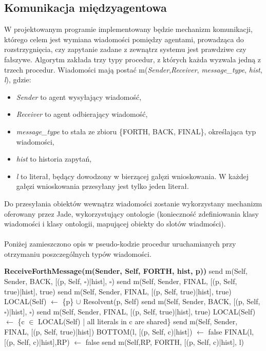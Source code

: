 \documentclass[a4paper,12pt]{mwart}
\begin{document}
\subsection{Komunikacja międzyagentowa}
W projektowanym programie implementowany będzie mechanizm komunikacji, którego celem jest wymiana wiadomości pomiędzy agentami, prowadząca do rozstrzygnięcia, czy zapytanie zadane z zewnątrz systemu jest prawdziwe czy fałszywe.
Algorytm zakłada trzy typy procedur, z których każda wyzwala jedną z trzech procedur. Wiadomości mają postać m(\textit{Sender},\textit{Receiver}, \textit{message\_type}, \textit{hist}, \textit{l}), gdzie:
\begin{itemize}
\item \textit{Sender} to agent wysyłający wiadomość,
\item \textit{Receiver} to agent odbierający wiadomość,
\item \textit{message\_type} to stała ze zbioru \{FORTH, BACK, FINAL\}, określająca typ wiadomości,
\item \textit{hist} to historia zapytań,
\item \textit{l} to literał, będący dowodzony w bierzącej gałęzi wnioskowania. W każdej gałęzi wnioskowania przesyłany jest tylko jeden literał.
\end{itemize}
Do przesyłania obiektów wewnątrz wiadomości zostanie wykorzystany mechanizm oferowany przez Jade, wykorzystujący ontologie (konieczność zdefiniowania klasy wiadomości i klasy ontologii, mapującej obiekty do slotów wiadmości). 
\\\\
Poniżej zamieszczono opis w pseudo-kodzie procedur uruchamianych przy otrzymaniu poszczególnych typów wiadomości.
\begin{algorithm}[H]
\begin{algorithmic}
\STATE \textbf{ReceiveForthMessage(m(Sender, Self, FORTH, hist, p))}
\STATE send m(Self, Sender, BACK, [(p, Self, $\square$)|hist], $\square$)
\STATE send m(Self, Sender, FINAL, [(p, Self, true)|hist], true)
\STATE send m(Self, Sender, FINAL, [(p, Self, true)|hist], true)
\ELSE
\STATE LOCAL(Self) $\leftarrow$ \{p\} $\cup$ Resolvent(p, Self)
\STATE send m(Self, Sender, BACK, [(p, Self, $\square$)|hist], $\square$)
\STATE send m(Self, Sender, FINAL, [(p, Self, true)|hist], true)
\ELSE
\STATE LOCAL(Self) $\leftarrow$ \{c $\in$ LOCAL(Self) | all literals in c are shared\}
\STATE send m(Self, Sender, FINAL, [(p, Self, true)|hist])
\ENDIF
{}
\STATE BOTTOM(l, [(p, Self, c)|hist]) $\leftarrow$ false
\STATE FINAL(l, [(p, Self, c)|hist],RP) $\leftarrow$ false
\STATE send m(Self,RP, FORTH, [(p, Self, c)|hist], l)
\ENDFOR
\ENDFOR
\ENDFOR
\ENDIF
\ENDIF
\end{algorithmic}
\end{algorithm}
\end{document}
